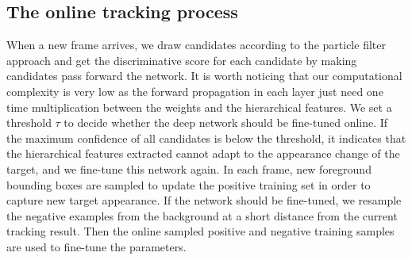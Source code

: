 \documentclass[preprint,12pt,review]{elsarticle}
\begin{document}
\subsection{The online tracking process}

When a new frame arrives, we draw candidates according to the particle filter approach and get the discriminative score for each candidate by making candidates pass forward the network.
%
It is worth noticing that our computational complexity is very low as the forward propagation in each layer just need one time multiplication between the weights and the hierarchical features.
%
We set a threshold $\tau$ to decide whether the deep network should be fine-tuned online.
%
If the maximum confidence of all candidates is below the threshold, it indicates that the hierarchical features extracted cannot adapt to the appearance change of the target, and we fine-tune this network again.
%
In each frame, new foreground bounding boxes are sampled to update the positive training set in order to capture new target appearance.
%
If the network should be fine-tuned, we resample the negative examples from the background at a short distance from the current tracking result.
%
Then the online sampled positive and negative training samples are used to fine-tune the parameters.
\end{document}
